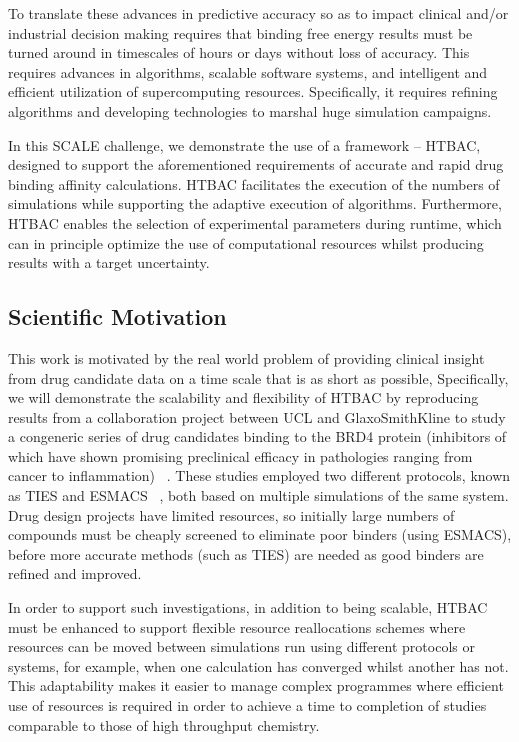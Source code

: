 \documentclass[conference]{IEEEtran}
\begin{document}
To translate these advances in predictive accuracy so as to impact clinical
and/or industrial decision making requires that binding free energy results
must be turned around in timescales of hours or days without loss of accuracy.
This requires advances in algorithms, scalable software systems, and
intelligent and efficient utilization of supercomputing resources.
Specifically, it requires refining algorithms and developing technologies to
marshal huge simulation campaigns.

In this SCALE challenge, we demonstrate the use of a framework -- HTBAC,
   designed to support the aforementioned requirements of accurate and rapid
   drug binding affinity calculations. HTBAC facilitates the execution of the
   numbers of simulations while supporting the adaptive execution of
   algorithms. Furthermore, HTBAC  enables the selection of experimental
   parameters during runtime, which can in principle optimize the use of
   computational resources whilst producing results with a target uncertainty.



\subsection{Scientific Motivation}\label{sec:motivation}

This work is motivated by the real world problem of providing clinical insight
from drug candidate data on a time scale that is as short as possible,
Specifically, we will demonstrate the scalability and flexibility of HTBAC by
reproducing results from a collaboration project between UCL and
GlaxoSmithKline to study a congeneric series of drug candidates binding to the
BRD4 protein (inhibitors of which have shown promising preclinical efficacy in
pathologies ranging from cancer to inflammation) ~\cite{Wan2017brd4}. These
studies employed two different protocols, known as TIES and ESMACS
~\cite{Bhati2017}, both based on multiple simulations of the same system. Drug
design projects have limited resources, so initially large numbers of
compounds must be cheaply screened to eliminate poor binders (using ESMACS),
before more accurate methods (such as TIES) are needed as good binders are
refined and improved.

In order to support such investigations, in addition to being scalable, HTBAC
must be enhanced to support flexible resource reallocations schemes where
resources can be moved between simulations run using different protocols or
systems, for example, when one calculation has converged whilst another has
not. This adaptability makes it easier to manage complex programmes where
efficient use of resources is required in order to achieve a time to
completion of studies comparable to those of high throughput chemistry.
\end{document}
